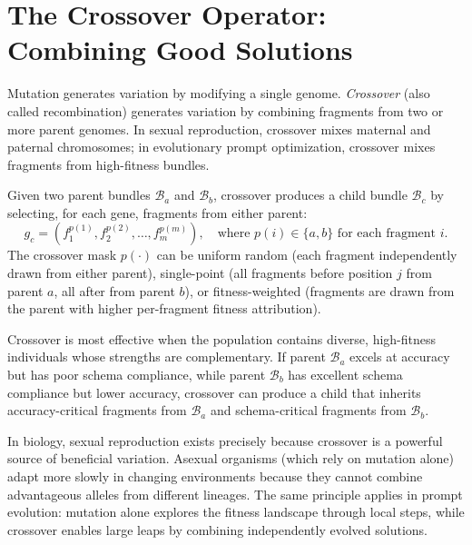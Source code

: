 \section{The Crossover Operator: Combining Good Solutions}
\label{sec:crossover}

Mutation generates variation by modifying a single genome. \emph{Crossover} (also called recombination) generates variation by combining fragments from two or more parent genomes. In sexual reproduction, crossover mixes maternal and paternal chromosomes; in evolutionary prompt optimization, crossover mixes fragments from high-fitness bundles.

\begin{dogmadef}
Given two parent bundles $\mathcal{B}_a$ and $\mathcal{B}_b$, crossover produces a child bundle $\mathcal{B}_c$ by selecting, for each gene, fragments from either parent:
\begin{equation}
g_c = (f_1^{p(1)}, f_2^{p(2)}, \ldots, f_m^{p(m)}), \quad \text{where } p(i) \in \{a, b\} \text{ for each fragment } i.
\end{equation}
The crossover mask $p(\cdot)$ can be uniform random (each fragment independently drawn from either parent), single-point (all fragments before position $j$ from parent $a$, all after from parent $b$), or fitness-weighted (fragments are drawn from the parent with higher per-fragment fitness attribution).
\end{dogmadef}

Crossover is most effective when the population contains diverse, high-fitness individuals whose strengths are complementary. If parent $\mathcal{B}_a$ excels at accuracy but has poor schema compliance, while parent $\mathcal{B}_b$ has excellent schema compliance but lower accuracy, crossover can produce a child that inherits accuracy-critical fragments from $\mathcal{B}_a$ and schema-critical fragments from $\mathcal{B}_b$.

\begin{bioinsight}
In biology, sexual reproduction exists precisely because crossover is a powerful source of beneficial variation. Asexual organisms (which rely on mutation alone) adapt more slowly in changing environments because they cannot combine advantageous alleles from different lineages. The same principle applies in prompt evolution: mutation alone explores the fitness landscape through local steps, while crossover enables large leaps by combining independently evolved solutions.
\end{bioinsight}

